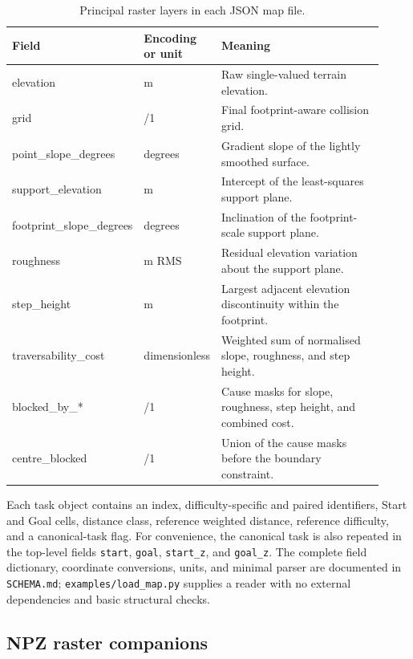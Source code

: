 \documentclass[11pt]{article}
\begin{document}
\begin{table}[htbp]
  \centering
  \caption{Principal raster layers in each JSON map file.}
  \label{tab:raster-fields}
  \small
  \begin{tabular}{>{\ttfamily\raggedright\arraybackslash}p{0.28\linewidth}
                  >{\raggedright\arraybackslash}p{0.16\linewidth}
                  >{\raggedright\arraybackslash}p{0.48\linewidth}}
    \toprule
    \normalfont Field & Encoding or unit & Meaning \\
    \midrule
    elevation & m & Raw single-valued terrain elevation. \\
    grid & 0/1 & Final footprint-aware collision grid. \\
    point\_slope\_degrees & degrees & Gradient slope of the lightly smoothed surface. \\
    support\_elevation & m & Intercept of the least-squares support plane. \\
    footprint\_slope\_degrees & degrees & Inclination of the footprint-scale support plane. \\
    roughness & m RMS & Residual elevation variation about the support plane. \\
    step\_height & m & Largest adjacent elevation discontinuity within the footprint. \\
    traversability\_cost & dimensionless & Weighted sum of normalised slope, roughness, and step height. \\
    blocked\_by\_* & 0/1 & Cause masks for slope, roughness, step height, and combined cost. \\
    centre\_blocked & 0/1 & Union of the cause masks before the boundary constraint. \\
    \bottomrule
  \end{tabular}
\end{table}

Each task object contains an index, difficulty-specific and paired identifiers,
Start and Goal cells, distance class, reference weighted distance, reference
difficulty, and a canonical-task flag. For convenience, the canonical task is
also repeated in the top-level fields \texttt{start}, \texttt{goal},
\texttt{start\_z}, and \texttt{goal\_z}. The complete field dictionary,
coordinate conversions, units, and minimal parser are documented in
\texttt{SCHEMA.md}; \texttt{examples/load\_map.py} supplies a reader with no
external dependencies and basic structural checks.

\subsection{NPZ raster companions}
\end{document}
